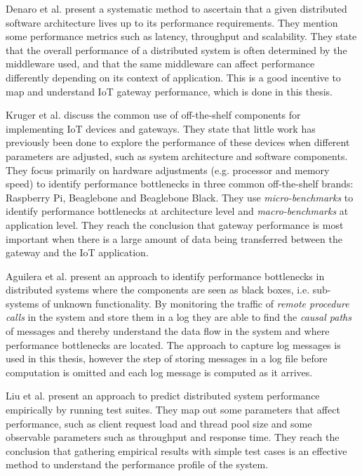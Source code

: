 Denaro et al. \cite{denaro2005performance} present a systematic method to
ascertain that a given distributed software architecture lives up to its
performance requirements. They mention some performance metrics such as
latency, throughput and scalability. They state that the overall performance of
a distributed system is often determined by the middleware used, and that the
same middleware can affect performance differently depending on its context of
application. This is a good incentive to map and understand IoT gateway
performance, which is done in this thesis.

Kruger et al. \cite{kruger2014benchmarking} discuss the common use of
off-the-shelf components for implementing IoT devices and gateways. They state
that little work has previously been done to explore the performance of these
devices when different parameters are adjusted, such as system architecture and
software components. They focus primarily on hardware adjustments (e.g.
processor and memory speed) to identify performance bottlenecks in three common
off-the-shelf brands: Raspberry Pi, Beaglebone and Beaglebone Black. They use
\textit{micro-benchmarks} to identify performance bottlenecks at architecture
level and \textit{macro-benchmarks} at application level. They reach the
conclusion that gateway performance is most important when there is a large
amount of data being transferred between the gateway and the IoT application.

Aguilera et al. \cite{aguilera2003performance} present an approach to identify
performance bottlenecks in distributed systems where the components are seen as
black boxes, i.e. sub-systems of unknown functionality. By monitoring the
traffic of \textit{remote procedure calls} in the system and store them in a
log they are able to find the \textit{causal paths} of messages and thereby
understand the data flow in the system and where performance bottlenecks are
located. The approach to capture log messages is used in this thesis, however
the step of storing messages in a log file before computation is omitted and
each log message is computed as it arrives.

Liu et al. \cite{liu2002designing} present an approach to predict distributed
system performance empirically by running test suites. They map out some
parameters that affect performance, such as client request load and thread pool
size and some observable parameters such as throughput and response time. They
reach the conclusion that gathering empirical results with simple test cases is
an effective method to understand the performance profile of the system.

